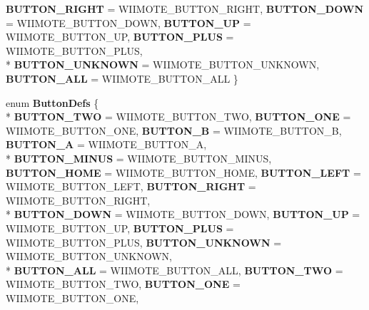 \begin{DoxyCompactItemize}
{\bfseries B\-U\-T\-T\-O\-N\-\_\-\-R\-I\-G\-H\-T} =  W\-I\-I\-M\-O\-T\-E\-\_\-\-B\-U\-T\-T\-O\-N\-\_\-\-R\-I\-G\-H\-T, 
{\bfseries B\-U\-T\-T\-O\-N\-\_\-\-D\-O\-W\-N} =  W\-I\-I\-M\-O\-T\-E\-\_\-\-B\-U\-T\-T\-O\-N\-\_\-\-D\-O\-W\-N, 
{\bfseries B\-U\-T\-T\-O\-N\-\_\-\-U\-P} =  W\-I\-I\-M\-O\-T\-E\-\_\-\-B\-U\-T\-T\-O\-N\-\_\-\-U\-P, 
{\bfseries B\-U\-T\-T\-O\-N\-\_\-\-P\-L\-U\-S} =  W\-I\-I\-M\-O\-T\-E\-\_\-\-B\-U\-T\-T\-O\-N\-\_\-\-P\-L\-U\-S, 
\\*
{\bfseries B\-U\-T\-T\-O\-N\-\_\-\-U\-N\-K\-N\-O\-W\-N} =  W\-I\-I\-M\-O\-T\-E\-\_\-\-B\-U\-T\-T\-O\-N\-\_\-\-U\-N\-K\-N\-O\-W\-N, 
{\bfseries B\-U\-T\-T\-O\-N\-\_\-\-A\-L\-L} =  W\-I\-I\-M\-O\-T\-E\-\_\-\-B\-U\-T\-T\-O\-N\-\_\-\-A\-L\-L
 \}
\item 
enum {\bfseries Button\-Defs} \{ \\*
{\bfseries B\-U\-T\-T\-O\-N\-\_\-\-T\-W\-O} =  W\-I\-I\-M\-O\-T\-E\-\_\-\-B\-U\-T\-T\-O\-N\-\_\-\-T\-W\-O, 
{\bfseries B\-U\-T\-T\-O\-N\-\_\-\-O\-N\-E} =  W\-I\-I\-M\-O\-T\-E\-\_\-\-B\-U\-T\-T\-O\-N\-\_\-\-O\-N\-E, 
{\bfseries B\-U\-T\-T\-O\-N\-\_\-\-B} =  W\-I\-I\-M\-O\-T\-E\-\_\-\-B\-U\-T\-T\-O\-N\-\_\-\-B, 
{\bfseries B\-U\-T\-T\-O\-N\-\_\-\-A} =  W\-I\-I\-M\-O\-T\-E\-\_\-\-B\-U\-T\-T\-O\-N\-\_\-\-A, 
\\*
{\bfseries B\-U\-T\-T\-O\-N\-\_\-\-M\-I\-N\-U\-S} =  W\-I\-I\-M\-O\-T\-E\-\_\-\-B\-U\-T\-T\-O\-N\-\_\-\-M\-I\-N\-U\-S, 
{\bfseries B\-U\-T\-T\-O\-N\-\_\-\-H\-O\-M\-E} =  W\-I\-I\-M\-O\-T\-E\-\_\-\-B\-U\-T\-T\-O\-N\-\_\-\-H\-O\-M\-E, 
{\bfseries B\-U\-T\-T\-O\-N\-\_\-\-L\-E\-F\-T} =  W\-I\-I\-M\-O\-T\-E\-\_\-\-B\-U\-T\-T\-O\-N\-\_\-\-L\-E\-F\-T, 
{\bfseries B\-U\-T\-T\-O\-N\-\_\-\-R\-I\-G\-H\-T} =  W\-I\-I\-M\-O\-T\-E\-\_\-\-B\-U\-T\-T\-O\-N\-\_\-\-R\-I\-G\-H\-T, 
\\*
{\bfseries B\-U\-T\-T\-O\-N\-\_\-\-D\-O\-W\-N} =  W\-I\-I\-M\-O\-T\-E\-\_\-\-B\-U\-T\-T\-O\-N\-\_\-\-D\-O\-W\-N, 
{\bfseries B\-U\-T\-T\-O\-N\-\_\-\-U\-P} =  W\-I\-I\-M\-O\-T\-E\-\_\-\-B\-U\-T\-T\-O\-N\-\_\-\-U\-P, 
{\bfseries B\-U\-T\-T\-O\-N\-\_\-\-P\-L\-U\-S} =  W\-I\-I\-M\-O\-T\-E\-\_\-\-B\-U\-T\-T\-O\-N\-\_\-\-P\-L\-U\-S, 
{\bfseries B\-U\-T\-T\-O\-N\-\_\-\-U\-N\-K\-N\-O\-W\-N} =  W\-I\-I\-M\-O\-T\-E\-\_\-\-B\-U\-T\-T\-O\-N\-\_\-\-U\-N\-K\-N\-O\-W\-N, 
\\*
{\bfseries B\-U\-T\-T\-O\-N\-\_\-\-A\-L\-L} =  W\-I\-I\-M\-O\-T\-E\-\_\-\-B\-U\-T\-T\-O\-N\-\_\-\-A\-L\-L, 
{\bfseries B\-U\-T\-T\-O\-N\-\_\-\-T\-W\-O} =  W\-I\-I\-M\-O\-T\-E\-\_\-\-B\-U\-T\-T\-O\-N\-\_\-\-T\-W\-O, 
{\bfseries B\-U\-T\-T\-O\-N\-\_\-\-O\-N\-E} =  W\-I\-I\-M\-O\-T\-E\-\_\-\-B\-U\-T\-T\-O\-N\-\_\-\-O\-N\-E, 

\end{DoxyCompactItemize}
